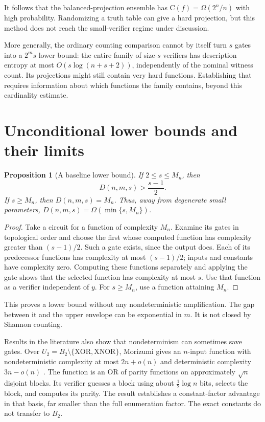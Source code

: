 \documentclass[11pt]{article}
\newtheorem{proposition}[theorem]{Proposition}
\theoremstyle{definition}
\theoremstyle{remark}
\newcommand{\C}{\mathrm{C}}
\begin{document}
It follows that the balanced-projection ensemble has
$\C(f)=\Omega(2^n/n)$ with high probability. Randomizing a truth
table can give a hard projection, but this method does not reach the
small-verifier regime under discussion.

More generally, the ordinary counting comparison cannot by itself
turn $s$ gates into a $2^m s$ lower bound: the entire family of
size-$s$ verifiers has description entropy at most
$O(s\log(n+s+2))$, independently of the nominal witness count.
Its projections might still contain very hard functions. Establishing
that requires information about which functions the family contains,
beyond this cardinality estimate.

\section{Unconditional lower bounds and their limits}

\begin{proposition}[A baseline lower bound]\label{prop:baseline}
If $2\le s\le M_n$, then
\[
 D(n,m,s)>\frac{s-1}{2}.
\]
If $s\ge M_n$, then $D(n,m,s)=M_n$. Thus, away from degenerate
small parameters, $D(n,m,s)=\Omega(\min\{s,M_n\})$.
\end{proposition}
\begin{proof}
Take a circuit for a function of complexity $M_n$. Examine its gates
in topological order and choose the first whose computed function has
complexity greater than $(s-1)/2$. Such a gate exists, since the
output does. Each of its predecessor functions has complexity at most
$(s-1)/2$; inputs and constants have complexity zero. Computing these
functions separately and applying the gate shows that the selected
function has complexity at most $s$. Use that function as a verifier
independent of $y$. For $s\ge M_n$, use a function attaining $M_n$.
\end{proof}

This proves a lower bound without any nondeterministic amplification.
The gap between it and the upper envelope can be exponential in $m$.
It is not closed by Shannon counting.

Results in the literature also show that nondeterminism can sometimes save
gates. Over $U_2=B_2\setminus\{\mathrm{XOR},\mathrm{XNOR}\}$,
Morizumi gives an $n$-input function with nondeterministic complexity
at most $2n+o(n)$ and deterministic complexity $3n-o(n)$
\citep[Theorem~3]{Morizumi2018}. The function is an OR of parity
functions on approximately $\sqrt n$ disjoint blocks. Its verifier
guesses a block using about $\tfrac12\log n$ bits, selects the block,
and computes its parity. The result establishes a constant-factor
advantage in that basis, far smaller than the full enumeration factor.
The exact constants do not transfer to $B_2$.
\end{document}
